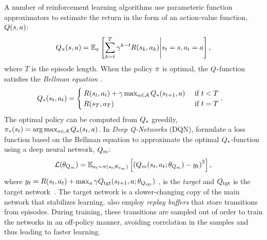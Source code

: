 A number of reinforcement learning algorithms use parameteric function
approximators to estimate the return in the form of 
an action-value function, $Q(s, a)$:
%
\begin{align}
Q_\pi(s, a) = \mathbb{E}_\pi\left[ \sum_{k=t}^T
  \gamma^{k-t} R(s_k, a_k)
  \middle| s_t = s, a_t = a \right] ,
  \label{eq:q-def}
\end{align}%
where $T$ is the episode length.
%
When the policy $\pi$ is optimal, the $Q$-function satisfies the
\emph{Bellman equation} \citep{bellman1954theory}.
%
\begin{align}
    Q_{*}(s_t, a_t)
  &=
    \begin{cases}
        R(s_t, a_t) + \gamma \max_{a \in \mathcal{A}}
        Q_{*}(s_{t+1}, a)
      & \text{ if } t < T
      \\
      R(s_T, a_T) & \text{ if } t = T
    \end{cases}.
  \label{eq:bellman}
\end{align}%
%
The optimal policy can be computed from $Q_{*}$ greedily, 
$\pi_*(s_t) = \arg \max_{a \in \mathcal{A}} Q_*(s_t,
a)$.
In \emph{Deep Q-Networks} (DQN), \citet{mnih2013playing} formulate a loss function based on 
the Bellman equation to approximate the optimal $Q_{*}$-function using
a deep neural network, $Q_m$:
%
%
\begin{align}
  \mathcal{L}(\theta_{Q_m}) =
    \mathbb{E}_{a_t\sim\pi(s_t; \theta_{\pi_m})}\left[\left(
  Q_m(s_t, a_t; \theta_{Q_m}) -
  y_t  \right)^2\right],
  \label{eq:bellman-dqn}
\end{align}
where 
$y_t = R(s_t, a_t) + \max_{a}\gamma Q_{\text{tgt}}(s_{t+1}, a; \theta_{Q_{\text{tgt}}}) $
, is the \emph{target} and $Q_{\text{tgt}}$ is the target
network~\citep{MnKaSiNATURE2015}.
The target network is a slower-changing
copy of the main network that stabilizes learning.
\citet{MnKaSiNATURE2015} also employ \emph{replay buffers}
that store transitions from episodes. During training, these transitions are
sampled out of order to train the networks in an off-policy manner, avoiding
correlation in the samples and thus leading to faster learning.

